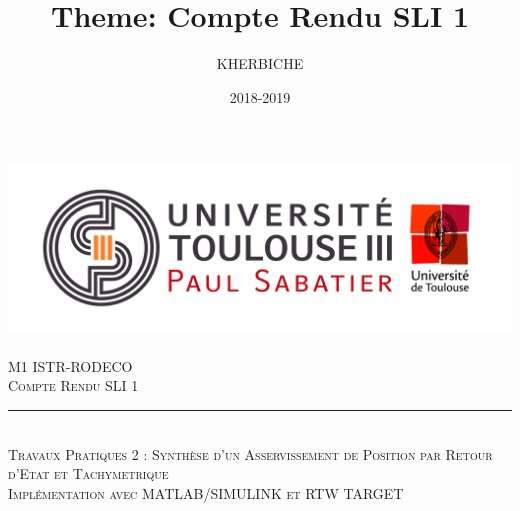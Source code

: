 \documentclass[12pt, a4paper, openany]{report}
\title{Theme: Compte Rendu SLI 1}
\author{KHERBICHE \bsc{Ali}}
\date{2018-2019}
\newcommand{\HRule}{\rule{\linewidth}{0.5mm}}
\begin{document}
\makeatletter
\begin{titlepage}
\begin{sffamily}
\begin{center}
    \includegraphics[scale=0.5]{Logo_UT3.jpg}~\\[1cm]
    \textsc{\LARGE M1 ISTR-RODECO  }\\[1cm]
    \textsc{\Large Compte Rendu SLI 1}\\[1cm]
    \HRule \\[0.4cm] %
    { \huge  \textsc {Travaux Pratiques 2 : Synthèse d'un Asservissement de Position par Retour d'Etat et Tachymetrique\\ Implémentation avec MATLAB/SIMULINK et RTW TARGET \\[0.4cm] }}


\end{center}
\end{sffamily}
\end{titlepage}
\end{document}
